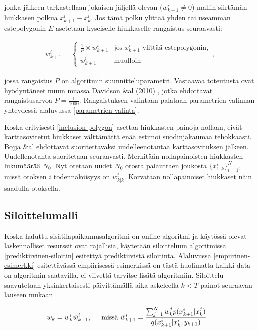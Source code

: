 \documentclass[
  12pt,
  a4paper, twoside]{book}
\begin{document}
\noindent jonka jälkeen tarkastellaan jokaisen jäljellä olevan (\(w^i_{k+1} \neq 0\)) mallin siirtämän hiukkasen polkua \(x_{k+1}^i-x_{k}^i\). Jos tämä polku ylittää yhden tai useamman estepolygonin \(E\) asetetaan kyseiselle hiukkaselle rangaistus seuraavasti:

\begin{align}\label{exclusion-polygon}
\displaystyle w^i_{k+1}={\begin{cases} \frac{1}{P} \times w^i_{k+1}&\text{jos } x^i_{k+1} \text{ ylittää estepolygonin},\\
w^i_{k+1}& \text{muulloin }\end{cases}},\end{align}

\noindent jossa rangaistus \(P\) on algoritmin suunnitteluparametri. Vastaavaa toteutusta ovat hyödyntäneet muun muassa Davidson \&al (2010) \citep{Davidson-2010}, jotka ehdottavat rangaistusarvoa \(P=\frac{1}{1000}\). Rangaistuksen valintaan palataan parametrien valinnan yhteydessä alaluvussa \ref{parametrien-valinta}.

Koska erityisesti \ref{inclusion-polygon} asettaa hiukkasten painoja nollaan, eivät karttasovitetut hiukkaset välttämättä enää estimoi suodinjakaumaa tehokkaasti. Bojja \&al \citep{Bojja-2015} ehdottavat suoritettavaksi uudelleenotantaa karttasovituksen jälkeen. Uudellenotanta suoritetaan seuraavasti. Merkitään nollapainoisten hiukkasten lukumäärää \(N_0\). Nyt otetaan uudet \(N_0\) otosta palauttaen joukosta \(\{x_{1:k}^i\}_{i=1}^N\), missä otoksen \(i\) todennäköisyys on \(w^i_{k|k}\). Korvataan nollapainoiset hiukkaset näin saadulla otoksella.

\hypertarget{siloittelumalli}{%
\subsection{Siloittelumalli}\label{siloittelumalli}}

Koska haluttu sisätilapaikannusalgoritmi on online-algoritmi ja käytössä olevat laskennalliset resurssit ovat rajallisia, käytetään siloitteluun algoritmissa \ref{prediktiivinen-siloitin} esitettyä prediktiivistä siloitinta. Alaluvussa \ref{empiirinen-esimerkki} esitettävässä empiirisessä esimerkissä on tästä huolimatta kaikki data on algoritmin saatavilla, ei viivettä tarvitse lisätä algoritmiin. Siloittelu saavutetaan yksinkertaisesti päivittämällä aika-askeleella \(k < T\) painot seuraavan lauseen mukaan

\begin{align}
&w_k = w_k^i \bar{w}^i_{k+1}, \hspace{0.5cm} \text{missä } \bar{w}^i_{k+1} = \frac{\sum_{j=1}^{N}w_{k}^j p(x_{k+1}^i|x_k^j)}{q(x_{k+1}^i|x_k^i,y_{k+1})}
\end{align}
\end{document}
